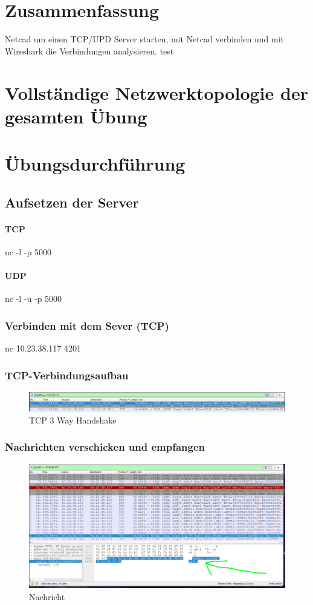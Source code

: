 \documentclass[a4paper]{article}
\begin{document}
\section{Zusammenfassung}
Netcad um einen TCP/UPD Server starten, mit Netcad verbinden und mit Wireshark die Verbindungen analysieren.
test
\newpage

\section{Vollständige Netzwerktopologie der gesamten Übung}

\newpage

\section{Übungsdurchführung}

\subsection{Aufsetzen der Server}
\paragraph{TCP}
nc -l -p 5000
\paragraph{UDP}
nc -l -u -p 5000

\subsubsection{Verbinden mit dem Sever (TCP)}
nc 10.23.38.117 4201
\subsubsection{TCP-Verbindungsaufbau}
\begin{figure}[h]
	\includegraphics[scale=0.3]{images/handshake.jpeg}
	\caption{TCP 3 Way Handshake}
\end{figure}
\subsubsection{Nachrichten verschicken und empfangen}
\begin{figure}[h]
	\includegraphics[scale=0.3]{images/nachricht.jpeg}
	\caption{Nachricht}
\end{figure}
\newpage
\end{document}
